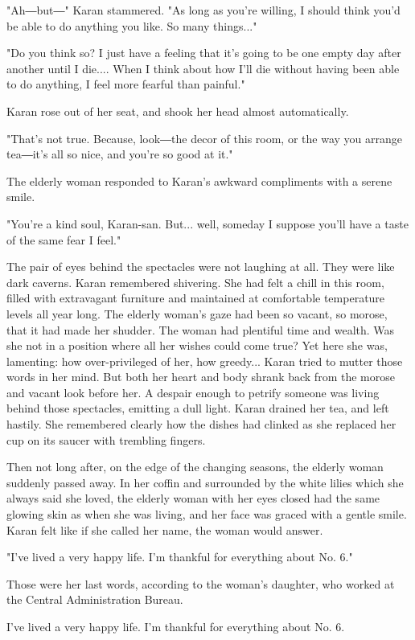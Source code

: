 "Ah―but―" Karan stammered. "As long as you're willing, I should think
you'd be able to do anything you like. So many things..."

"Do you think so? I just have a feeling that it's going to be one empty
day after another until I die.... When I think about how I'll die
without having been able to do anything, I feel more fearful than
painful."

Karan rose out of her seat, and shook her head almost automatically.

"That's not true. Because, look―the decor of this room, or the way you
arrange tea―it's all so nice, and you're so good at it."

The elderly woman responded to Karan's awkward compliments with a serene
smile.

"You're a kind soul, Karan-san. But... well, someday I suppose you'll
have a taste of the same fear I feel."

The pair of eyes behind the spectacles were not laughing at all. They
were like dark caverns. Karan remembered shivering. She had felt a chill
in this room, filled with extravagant furniture and maintained at
comfortable temperature levels all year long. The elderly woman's gaze
had been so vacant, so morose, that it had made her shudder. The woman
had plentiful time and wealth. Was she not in a position where all her
wishes could come true? Yet here she was, lamenting: how over-privileged
of her, how greedy... Karan tried to mutter those words in her mind. But
both her heart and body shrank back from the morose and vacant look
before her. A despair enough to petrify someone was living behind those
spectacles, emitting a dull light. Karan drained her tea, and left
hastily. She remembered clearly how the dishes had clinked as she
replaced her cup on its saucer with trembling fingers.

Then not long after, on the edge of the changing seasons, the elderly
woman suddenly passed away. In her coffin and surrounded by the white
lilies which she always said she loved, the elderly woman with her eyes
closed had the same glowing skin as when she was living, and her face
was graced with a gentle smile. Karan felt like if she called her name,
the woman would answer.

"I've lived a very happy life. I'm thankful for everything about No. 6."

Those were her last words, according to the woman's daughter, who worked
at the Central Administration Bureau.

I've lived a very happy life. I'm thankful for everything about No. 6.


